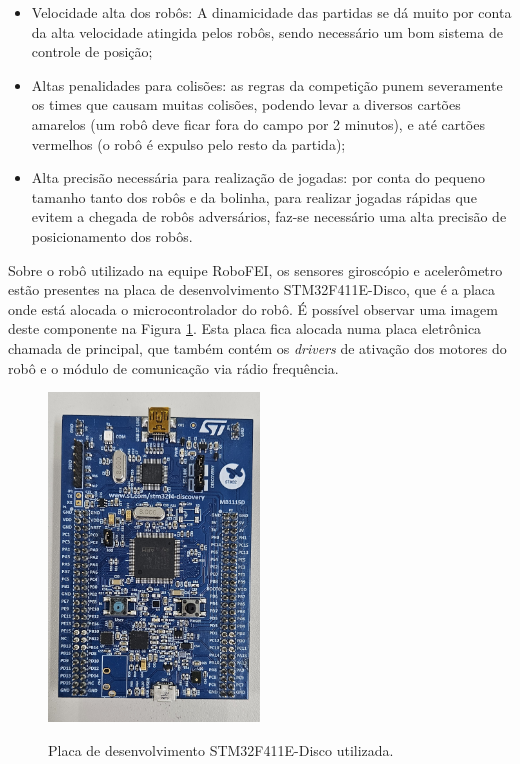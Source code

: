 \documentclass[acronym, symbols, table]{fei}
\begin{document}
		\begin{itemize}
			\item Velocidade alta dos robôs: A dinamicidade das partidas se dá muito por conta da alta velocidade atingida pelos robôs, sendo necessário um bom sistema de controle de posição;
			
			\item Altas penalidades para colisões: as regras da competição punem severamente os times que causam muitas colisões, podendo levar a diversos cartões amarelos (um robô deve ficar fora do campo por 2 minutos), e até cartões vermelhos (o robô é expulso pelo resto da partida);
			
			\item Alta precisão necessária para realização de jogadas: por conta do pequeno tamanho tanto dos robôs e da bolinha, para realizar jogadas rápidas que evitem a chegada de robôs adversários, faz-se necessário uma alta precisão de posicionamento dos robôs.
		\end{itemize}
		
		Sobre o robô utilizado na equipe RoboFEI, os sensores giroscópio e acelerômetro estão presentes na placa de desenvolvimento STM32F411E-Disco, que é a placa onde está alocada o microcontrolador do robô. É possível observar uma imagem deste componente na Figura \ref{fig:stm32f411}. Esta placa fica alocada numa placa eletrônica chamada de principal, que também contém os \textit{drivers} de ativação dos motores do robô e o módulo de comunicação via rádio frequência.
		
		\begin{figure}[!htb]
			\centering
			\caption{Placa de desenvolvimento STM32F411E-Disco utilizada.}
			\includegraphics[width=0.5\textwidth]{stm32f411.jpg}
			\label{fig:stm32f411}
		\end{figure}
		
\end{document}
